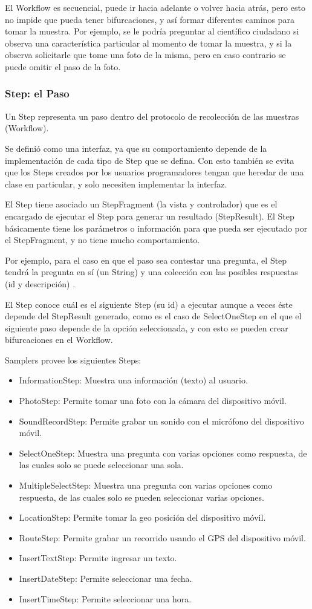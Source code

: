El Workflow es secuencial, puede ir hacia adelante o volver hacia atrás, pero esto no impide que pueda tener bifurcaciones, y así formar diferentes caminos para tomar la muestra. Por ejemplo, se le podría preguntar al científico ciudadano si observa una característica particular al momento de tomar la muestra, y si la observa solicitarle que tome una foto de la misma, pero en caso contrario se puede omitir el paso de la foto.

\subsubsection{Step: el Paso}
Un Step representa un paso dentro del protocolo de recolección de las muestras (Workflow).

Se definió como una interfaz, ya que su comportamiento depende de la implementación de cada tipo de Step que se defina. Con esto también se evita que los Steps creados por los usuarios programadores tengan que heredar de una clase en particular, y solo necesiten implementar la interfaz.

El Step tiene asociado un StepFragment (la vista y controlador) que es el encargado de ejecutar el Step para generar un resultado (StepResult). El Step básicamente tiene los parámetros o información para que pueda ser ejecutado por el StepFragment, y no tiene mucho comportamiento.

Por ejemplo, para el caso en que el paso sea contestar una pregunta, el Step tendrá la pregunta en sí (un String) y una colección con las posibles respuestas (id y descripción) .

El Step conoce cuál es el siguiente Step (su id) a ejecutar aunque a veces éste depende del StepResult generado, como es el caso de SelectOneStep en el que el siguiente paso depende de la opción seleccionada, y con esto se pueden crear bifurcaciones en el Workflow.

Samplers provee los siguientes Steps:
\begin{itemize}
	\item InformationStep: Muestra una información (texto) al usuario.
	\item PhotoStep: Permite tomar una foto con la cámara del dispositivo móvil.
	\item SoundRecordStep: Permite grabar un sonido con el micrófono del dispositivo móvil.
	\item SelectOneStep: Muestra una pregunta con varias opciones como respuesta, de las cuales solo se puede seleccionar una sola.
	\item MultipleSelectStep: Muestra una pregunta con varias opciones como respuesta, de las cuales solo se pueden seleccionar varias opciones.
	\item LocationStep: Permite tomar la geo posición del dispositivo móvil.
	\item RouteStep: Permite grabar un recorrido usando el GPS del dispositivo móvil.
	\item InsertTextStep: Permite ingresar un texto.
	\item InsertDateStep: Permite seleccionar una fecha.
	\item InsertTimeStep: Permite seleccionar una hora.
\end{itemize}

